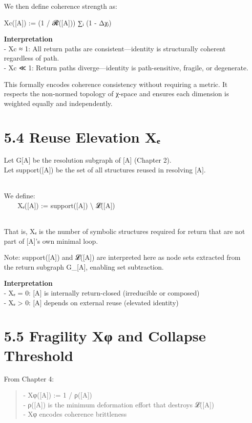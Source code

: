 We then define coherence strength as:

Xc({[}A{]}) := (1 / \textbar 𝓡({[}A{]})\textbar) ∑ᵢ (1 - Δχᵢ)

\textbf{Interpretation}\\
- Xc ≈ 1: All return paths are consistent---identity is structurally
coherent regardless of path.\\
- Xc ≪ 1: Return paths diverge---identity is path-sensitive, fragile, or
degenerate.

This formally encodes coherence consistency without requiring a metric.
It respects the non-normed topology of χ-space and ensures each
dimension is weighted equally and independently.

\section{5.4 \textbar{} Reuse Elevation
Xₑ}\label{reuse-elevation-xux2091}

Let G{[}A{]} be the resolution subgraph of {[}A{]} (Chapter 2).\\
Let support({[}A{]}) be the set of all structures reused in resolving
{[}A{]}.\\
\strut \\
We define:\\
  Xₑ({[}A{]}) := \textbar support({[}A{]}) \textbackslash{}
𝓛({[}A{]})\textbar{}\\
\strut \\
That is, Xₑ is the number of symbolic structures required for return
that are not part of {[}A{]}'s own minimal loop.

Note: support({[}A{]}) and 𝓛({[}A{]}) are interpreted here as node sets
extracted from the return subgraph G\_{[}A{]}, enabling set subtraction.

\textbf{Interpretation}\\
- Xₑ = 0: {[}A{]} is internally return-closed (irreducible or
composed)\\
- Xₑ \textgreater{} 0: {[}A{]} depends on external reuse (elevated
identity)

\section{5.5 \textbar{} Fragility Xφ and Collapse
Threshold}\label{fragility-xux3c6-and-collapse-threshold}

From Chapter 4:

\begin{quote}
- Xφ({[}A{]}) := 1 / ρ({[}A{]})\\
- ρ({[}A{]}) is the minimum deformation effort that destroys
𝓛({[}A{]})\\
- Xφ encodes coherence brittleness
\end{quote}

